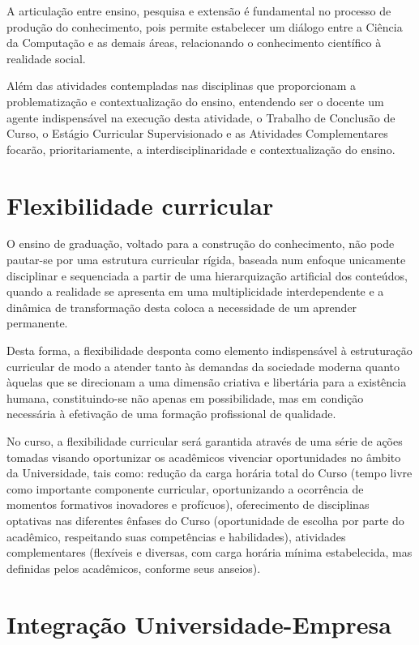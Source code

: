 \documentclass[
	12pt,				%
	openright,			%
  oneside,     %
	a4paper,			%
	english,			%
	french,				%
	spanish,			%
	brazil				%
	]{abntex2}
\begin{document}
A articulação entre ensino, pesquisa e extensão é fundamental no processo de
produção do conhecimento, pois permite estabelecer um diálogo entre a Ciência da
Computação e as demais áreas, relacionando o conhecimento científico à realidade
social. 

Além das atividades contempladas nas disciplinas que proporcionam a
problematização e contextualização do ensino, entendendo ser o docente um agente
indispensável na execução desta atividade, o Trabalho de Conclusão de Curso, o
Estágio Curricular Supervisionado e as Atividades Complementares focarão,
prioritariamente, a interdisciplinaridade e contextualização do ensino. 

\section{Flexibilidade curricular}

O ensino de graduação, voltado para a construção do
conhecimento, não pode pautar-se por uma estrutura curricular rígida, baseada
num enfoque unicamente disciplinar e sequenciada a partir de uma hierarquização
artificial dos conteúdos, quando a realidade se apresenta em uma multiplicidade
interdependente e a dinâmica de transformação desta coloca a necessidade de um
aprender permanente. 

Desta forma, a flexibilidade desponta como elemento
indispensável à estruturação curricular de modo a atender tanto às demandas da
sociedade moderna quanto àquelas que se direcionam a uma dimensão criativa e
libertária para a existência humana, constituindo-se não apenas em
possibilidade, mas em condição necessária à efetivação de uma formação
profissional de qualidade. 

No curso, a flexibilidade curricular será garantida
através de uma série de ações tomadas visando oportunizar os acadêmicos
vivenciar oportunidades no âmbito da Universidade, tais como: redução da carga
horária total do Curso (tempo livre como importante componente curricular,
oportunizando a ocorrência de momentos formativos inovadores e profícuos),
oferecimento de disciplinas optativas nas diferentes ênfases do Curso
(oportunidade de escolha por parte do acadêmico, respeitando suas competências e
habilidades), atividades complementares (flexíveis e diversas, com carga horária
mínima estabelecida, mas definidas pelos acadêmicos, conforme seus anseios). 

\section{Integração Universidade-Empresa}
\end{document}
